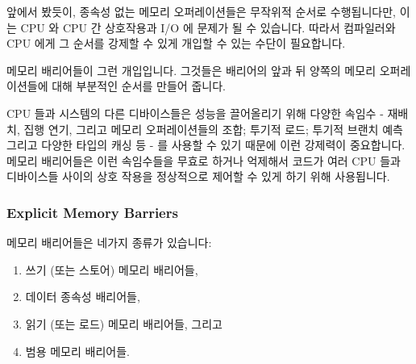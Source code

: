 \begin{enumerate}
앞에서 봤듯이, 종속성 없는 메모리 오퍼레이션들은 무작위적 순서로 수행됩니다만,
이는 CPU 와 CPU 간 상호작용과 I/O 에 문제가 될 수 있습니다.
따라서 컴파일러와 CPU 에게 그 순서를 강제할 수 있게 개입할 수 있는 수단이
필요합니다.

메모리 배리어들이 그런 개입입니다.
그것들은 배리어의 앞과 뒤 양쪽의 메모리 오퍼레이션들에 대해 부분적인 순서를
만들어 줍니다.

CPU 들과 시스템의 다른 디바이스들은 성능을 끌어올리기 위해 다양한 속임수 -
재배치, 집행 연기, 그리고 메모리 오퍼레이션들의 조합; 투기적 로드; 투기적
브랜치 예측 그리고 다양한 타입의 캐싱 등 - 를 사용할 수 있기 때문에 이런
강제력이 중요합니다.
메모리 배리어들은 이런 속임수들을 무효로 하거나 억제해서 코드가 여러 CPU 들과
디바이스들 사이의 상호 작용을 정상적으로 제어할 수 있게 하기 위해 사용됩니다.

\subsubsection{Explicit Memory Barriers}
\label{sec:advsync:Explicit Memory Barriers}

메모리 배리어들은 네가지 종류가 있습니다:

\begin{enumerate}
\item	쓰기 (또는 스토어) 메모리 배리어들,
\item	데이터 종속성 배리어들,
\item	읽기 (또는 로드) 메모리 배리어들, 그리고
\item	범용 메모리 배리어들.
\end{enumerate}


\end{enumerate}
